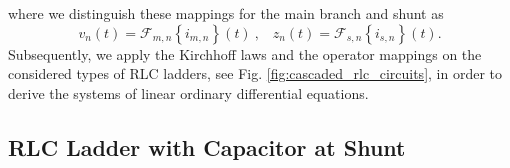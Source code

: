 where we distinguish these mappings for the main branch and shunt as
\begin{equation}
	v_{n}(t) = \mathcal{F}_{m,n} \left\{i_{m,n}\right\}(t) ~ \text{,} \quad 
	z_{n}(t) = \mathcal{F}_{s,n} \left\{i_{s,n}\right\}(t) \text{.} \label{eq:operator_maps}
\end{equation}
Subsequently, we apply the Kirchhoff laws and the operator mappings on the considered types of RLC ladders, see Fig. \ref{fig:cascaded_rlc_circuits}, in order to derive the systems of linear ordinary differential equations.



\subsection{RLC Ladder with Capacitor at Shunt}

